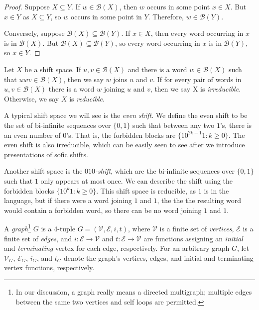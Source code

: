 \documentclass[hidelinks]{report}
\newcommand{\Vc}{\mathcal{V}}
\newcommand{\Ec}{\mathcal{E}}
\newcommand{\Bc}{\mathcal{B}}
\newcommand{\term}[1]{\textit{#1}}
\theoremstyle{definition}
\begin{document}
\begin{proof}
    Suppose \(X \subseteq Y\). If \(w \in \Bc(X)\), then \(w\) occurs in some point 
    \(x \in X\). But \(x \in Y\) as \(X \subseteq Y\), so \(w\) occurs in some point 
    in \(Y\). Therefore, \(w \in \Bc(Y)\).

    Conversely, suppose \(\Bc(X) \subseteq \Bc(Y)\). If \(x \in X\), then every 
    word occurring in \(x\) is in \(\Bc(X)\). But \(\Bc(X) \subseteq \Bc(Y)\), 
    so every word occurring in \(x\) is in \(\Bc(Y)\), so \(x \in Y\).
\end{proof}

\begin{definition}
    Let \(X\) be a shift space. If \(u, v \in \Bc(X)\) and there 
    is a word \(w \in \Bc(X)\) such that \(uwv \in \Bc(X)\), then we say 
    \(w\) joins \(u\) and \(v\). If for every pair of words in \(u, v \in \Bc(X)\) 
    there is a word \(w\) joining \(u\) and \(v\), then we say X is \term{irreducible}.
    Otherwise, we say \(X\) is \term{reducible}.
\end{definition}

\begin{example}
    A typical shift space we will see is the \term{even shift}. We define 
    the even shift to be the set of bi-infinite sequences over \(\{0, 1\}\)
    such that between any two \(1\)'s, there is an even number of \(0\)'s. That 
    is, the forbidden blocks are \(\{10^{2k+1}1 : k \geq 0\}\). The even shift is 
    also irreducible, which can be easily seen to see after we introduce 
    presentations of sofic shifts. 

    Another shift space is the \term{\(010\)-shift}, which are 
    the bi-infinite sequences over \(\{0, 1\}\) such that \(1\) only appears at most once. 
    We can describe the shift using the forbidden blocks \(\{10^k1 : k \geq 0\}\). This 
    shift space is reducible, as \(1\) is in the language, but if there 
    were a word joining \(1\) and \(1\), the the the resulting 
    word would contain a forbidden word, so there can be no word joining \(1\) and \(1\).
\end{example}

\begin{definition}
    A \term{graph}\footnote{
        In our discussion, a graph really means a directed multigraph; 
        multiple edges between the same two vertices and self loops are permitted.
    } \(G\) is a \(4\)-tuple \(G = (\Vc, \Ec, i, t)\), where \(\Vc\) is a finite 
    set of \term{vertices}, \(\Ec\) is a finite set of \term{edges}, and \(i : \Ec \to \Vc\) and 
    \(t : \Ec \to \Vc\) are functions assigning an \term{initial} and \term{terminating} vertex for 
    each edge, respectively. For an arbitrary graph \(G\), let 
    \(\Vc_G\), \(\Ec_G\), \(i_G\), and \(t_G\) denote the graph's vertices, edges, and 
    initial and terminating vertex functions, respectively. 
\end{definition}
\end{document}
